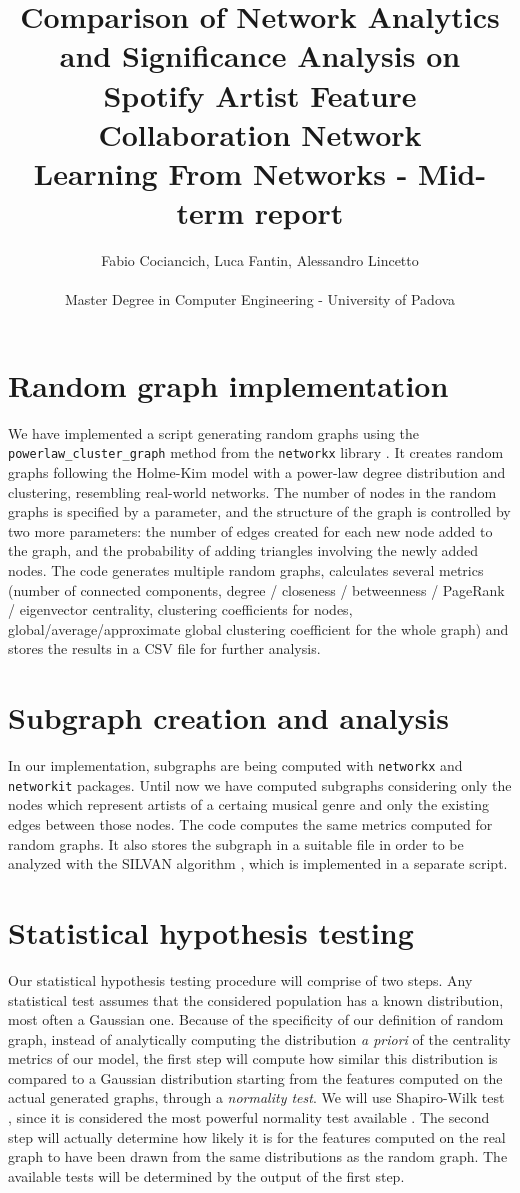 \documentclass[a4paper, 12pt, conference]{ieeeconf}      %
\title{Comparison of Network Analytics and Significance Analysis on Spotify Artist Feature Collaboration Network\\
\large Learning From Networks - Mid-term report \\}
\author{Fabio Cociancich, Luca Fantin, Alessandro Lincetto %
\\\\ Master Degree in Computer Engineering - University of Padova \\
}
\begin{document}
\maketitle
\thispagestyle{plain}
\pagestyle{plain}

\section{Random graph implementation}
We have implemented a script generating random graphs using the \texttt{powerlaw\_cluster\_graph} method from the \texttt{networkx} library \cite{NetworkX_Graph}. It creates random graphs following the Holme-Kim model \cite{Holme2002} with a power-law degree distribution and clustering, resembling real-world networks. The number of nodes in the random graphs is specified by a parameter, and the structure of the graph is controlled by two more parameters: the number of edges created for each new node added to the graph, and the probability of adding triangles involving the newly added nodes. The code generates multiple random graphs, calculates several metrics (number of connected components, degree / closeness / betweenness / PageRank / eigenvector centrality, clustering coefficients for nodes, global/average/approximate global clustering coefficient for the whole graph) and stores the results in a CSV file for further analysis.

\section{Subgraph creation and analysis}
In our implementation, subgraphs are being computed with \texttt{networkx} and \texttt{networkit} packages.
Until now we have computed subgraphs considering only the nodes which represent artists of a certaing musical genre and only the existing edges between those nodes. The code computes the same metrics computed for random graphs. It also stores the subgraph in a suitable file in order to be analyzed with the SILVAN algorithm \cite{SILVAN}, which is implemented in a separate script.

\section{Statistical hypothesis testing}

Our statistical hypothesis testing procedure will comprise of two steps. Any statistical test assumes that the considered population has a known distribution, most often a Gaussian one. Because of the specificity of our definition of random graph, instead of analytically computing the distribution \emph{a priori} of the centrality metrics of our model, the first step will compute how similar this distribution is compared to a Gaussian distribution starting from the features computed on the actual generated graphs, through a \emph{normality test}. We will use Shapiro-Wilk test \cite{ShapiroWilk1965}, since it is considered the most powerful normality test available \cite{RazaliYap2011}. The second step will actually determine how likely it is for the features computed on the real graph to have been drawn from the same distributions as the random graph. The available tests will be determined by the output of the first step.
\end{document}
